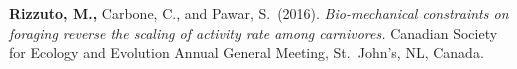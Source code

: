 
\vspace{7pt}

\textbf{Rizzuto, M.,} Carbone, C., and Pawar, S.~(2016).
\emph{Bio-mechanical constraints on foraging reverse the scaling of
activity rate among carnivores.}
Canadian Society for Ecology and Evolution Annual General Meeting,
St.\ John's, NL, Canada.
